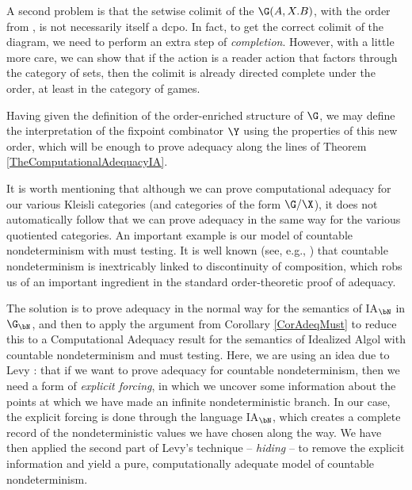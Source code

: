 A second problem is that the setwise colimit of the $\G(A,X.B)$, with the order from \cite{Fiech}, is not necessarily itself a dcpo.  
In fact, to get the correct colimit of the diagram, we need to perform an extra step of \emph{completion}.  
However, with a little more care, we can show that if the action is a reader action that factors through the category of sets, then the colimit is already directed complete under the order, at least in the category of games.

Having given the definition of the order-enriched structure of $\G$, we may define the interpretation of the fixpoint combinator $\Y$ using the properties of this new order, which will be enough to prove adequacy along the lines of Theorem \ref{TheComputationalAdequacyIA}.

It is worth mentioning that although we can prove computational adequacy for our various Kleisli categories (and categories of the form $\G/\X$), it does not automatically follow that we can prove adequacy in the same way for the various quotiented categories.  
An important example is our model of countable nondeterminism with must testing.  
It is well known (see, e.g., \cite{Apt,PlotkinApt}) that countable nondeterminism is inextricably linked to discontinuity of composition, which robs us of an important ingredient in the standard order-theoretic proof of adequacy.

The solution is to prove adequacy in the normal way for the semantics of IA${}_\bN$ in $\G_\bN$, and then to apply the argument from Corollary \ref{CorAdeqMust} to reduce this to a Computational Adequacy result for the semantics of Idealized Algol with countable nondeterminism and must testing.
Here, we are using an idea due to Levy \cite{LevyGsInfinite}: that if we want to prove adequacy for countable nondeterminism, then we need a form of \emph{explicit forcing}, in which we uncover some information about the points at which we have made an infinite nondeterministic branch.  
In our case, the explicit forcing is done through the language IA${}_\bN$, which creates a complete record of the nondeterministic values we have chosen along the way.  
We have then applied the second part of Levy's technique -- \emph{hiding} -- to remove the explicit information and yield a pure, computationally adequate model of countable nondeterminism.
